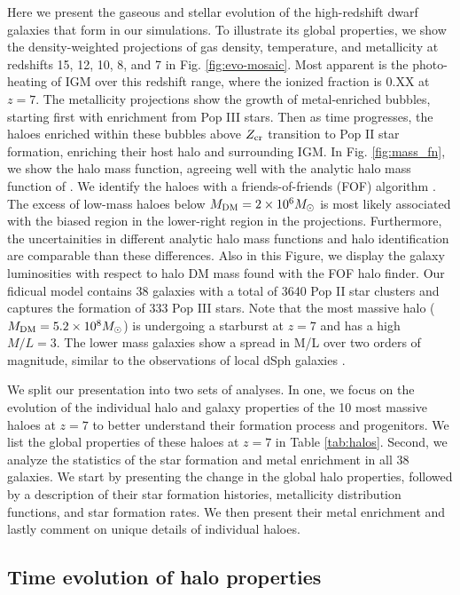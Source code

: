 \documentclass[useAMS,usenatbib]{mn2e}
\begin{document}
Here we present the gaseous and stellar evolution of the high-redshift
dwarf galaxies that form in our simulations.  To illustrate its global
properties, we show the density-weighted projections of gas density,
temperature, and metallicity at redshifts 15, 12, 10, 8, and 7 in
Fig. \ref{fig:evo-mosaic}.  Most apparent is the photo-heating of
IGM over this redshift range, where the ionized fraction is 0.XX at
$z=7$.  The metallicity projections show the growth of metal-enriched
bubbles, starting first with enrichment from Pop III stars.  Then as
time progresses, the haloes enriched within these bubbles above $Z_{\rm
  cr}$ transition to Pop II star formation, enriching their host halo
and surrounding IGM.  In Fig. \ref{fig:mass_fn}, we show the halo mass
function, agreeing well with the analytic halo mass function of
\citet{Warren06}.  We identify the haloes with a friends-of-friends
(FOF) algorithm \citep{Davis85}.  The excess of low-mass haloes below
$M_{\rm DM} = 2 \times 10^6 \Ms$ is most likely associated with the
biased region in the lower-right region in the projections.
Furthermore, the uncertainities in different analytic halo mass
functions \citep[e.g., see][for a comparison]{Reed07} and halo
identification are comparable than these differences.  Also in this
Figure, we display the galaxy luminosities with respect to halo DM
mass found with the FOF halo finder.  Our fidicual model contains 38
galaxies with a total of 3640 Pop II star clusters and captures the
formation of 333 Pop III stars.  Note that the most massive halo
($M_{\rm DM} = 5.2 \times 10^8 \Ms$) is undergoing a starburst at
$z=7$ and has a high $M/L = 3$.  The lower mass galaxies show a spread
in M/L over two orders of magnitude, similar to the observations of
local dSph galaxies \citep[e.g.][]{Strigari08}.

We split our presentation into two sets of analyses.  In one, we focus
on the evolution of the individual halo and galaxy properties of the
10 most massive haloes at $z=7$ to better understand their formation
process and progenitors.  We list the global properties of these
haloes at $z = 7$ in Table \ref{tab:halos}.  Second, we analyze the
statistics of the star formation and metal enrichment in all 38
galaxies.  We start by presenting the change in the global halo
properties, followed by a description of their star formation
histories, metallicity distribution functions, and star formation
rates.  We then present their metal enrichment and lastly comment on
unique details of individual haloes.

\subsection{Time evolution of halo properties}
\end{document}
